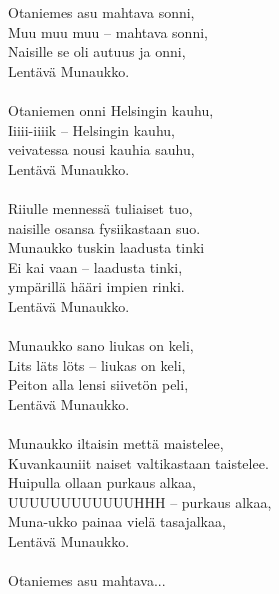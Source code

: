 
            Otaniemes asu mahtava sonni, \\
            Muu muu muu – mahtava sonni, \\
            Naisille se oli autuus ja onni, \\
            Lentävä Munaukko. \\
\hspace{10mm} \\
            Otaniemen onni Helsingin kauhu, \\
            Iiiii-iiiik – Helsingin kauhu, \\
            veivatessa nousi kauhia sauhu, \\
            Lentävä Munaukko. \\
\hspace{10mm} \\
            Riiulle mennessä tuliaiset tuo, \\
            naisille osansa fysiikastaan suo. \\
            Munaukko tuskin laadusta tinki \\
            Ei kai vaan – laadusta tinki, \\
            ympärillä hääri impien rinki. \\
            Lentävä Munaukko. \\
\hspace{10mm} \\
            Munaukko sano liukas on keli, \\
            Lits läts löts – liukas on keli, \\
            Peiton alla lensi siivetön peli, \\
            Lentävä Munaukko. \\
\hspace{10mm} \\
            Munaukko iltaisin mettä maistelee, \\
            Kuvankauniit naiset valtikastaan taistelee. \\
            Huipulla ollaan purkaus alkaa, \\
            UUUUUUUUUUUUHHH – purkaus alkaa, \\
            Muna-ukko painaa vielä tasajalkaa, \\
            Lentävä Munaukko. \\
\hspace{10mm} \\
            Otaniemes asu mahtava... \\
